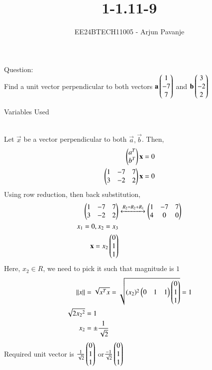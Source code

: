 \documentclass[journal]{IEEEtran}
\begin{document}

\vspace{3cm}

\title{1-1.11-9}
\author{EE24BTECH11005 - Arjun Pavanje
}
{\let\newpage\relax\maketitle}
Question:\\
Find a unit vector perpendicular to both vectors $\mathbf{a}\begin{pmatrix}1\\-7\\7\end{pmatrix}$ and $\mathbf{b}\begin{pmatrix}3\\-2\\2\end{pmatrix}$
\begin{table}[h!]    
  \centering
  
  \caption{Variables Used}
  \label{tab1-1.9-6}
\end{table}\\
\solution
Let $\vec{x}$ be a vector perpendicular to both $\vec{a},\vec{b}$. Then,
\begin{align}
	\begin{pmatrix}a^T\\b^T\end{pmatrix}\mathbf{x}=0\\
	\begin{pmatrix}1&-7&7\\3&-2&2\end{pmatrix}\mathbf{x}=0
\end{align}
Using row reduction, then back substitution,
\begin{align}
	\begin{pmatrix}1&-7&7\\3&-2&2\end{pmatrix}&\xleftrightarrow[]{R_2=R_2+R_1}\begin{pmatrix}1&-7&7\\4&0&0\end{pmatrix}\\
	x_1=0, x_2=x_3\\
	\mathbf{x}=x_2\begin{pmatrix}0\\1\\1\end{pmatrix}
\end{align}
Here, $x_2 \in R$, we need to pick it such that magnitude is $1$
\begin{align}
	\left\lVert x\right\rVert&=\sqrt{x^Tx}=\sqrt{(x_2)^2\begin{pmatrix}0&1&1\end{pmatrix}\begin{pmatrix}0\\1\\1\end{pmatrix}}=1\\
	\sqrt{2{x_2}^2}&=1\\
	x_2&=\pm \frac{1}{\sqrt{2}}
\end{align}
Required unit vector is $\frac{1}{\sqrt{2}}\begin{pmatrix}0\\1\\1\end{pmatrix}$ or$\frac{-1}{\sqrt{2}}\begin{pmatrix}0\\1\\1\end{pmatrix}$ 
\end{document}
